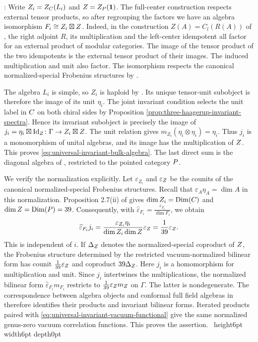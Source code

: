 \documentclass[leqno]{article}
\let\cal\relax
\newcommand{\cal}{\mathcal}
\newcommand{\Id}{\mathrm{Id}}
\newcommand{\qed}{\hfill \vrule height6pt  width6pt depth0pt}
\newcommand{\co}{\colon}
\newcommand{\ot}{\otimes}
\newcommand{\epsi}{\varepsilon}
\newenvironment{proof}[1][]{\noindent {\it Proof #1} : }{\hbox{~}\qed
\smallskip
}
\numberwithin{equation}{section}
\begin{document}
\begin{proof}
Write $Z_i = Z_{\cal C}(L_i)$ and $\cal Z = Z_{\cal P}(\mathbf1)$. The full-center construction respects external tensor products, so after regrouping the factors we have an algebra isomorphism
$F_i \cong Z_i\boxtimes \cal Z$.
Indeed, in the construction $Z(A) = C_l(R(A))$ of \cite[Definition 2.6 p.~9]{KoR08}, the right adjoint $R$, its multiplication and the left-center idempotent all factor for an external product of modular categories. The image of the tensor product of the two idempotents is the external tensor product of their images. The induced multiplication and unit also factor. The isomorphism respects the canonical normalized-special Frobenius structures by \cite[Lemma 2.3(iii) p.~6]{KoR08}.

The algebra $L_i$ is simple, so $Z_i$ is haploid by \cite[Proposition 2.7(ii) p.~9]{KoR08}. Its unique tensor-unit subobject is therefore the image of its unit $\eta_i$. The joint invariant condition selects the unit label in $\cal C$ on both chiral sides by Proposition \ref{prop:three-haagerup-invariant-spectra}. Hence its invariant subobject is precisely the image of
$j_i = \eta_i\boxtimes\Id_{\cal Z} \co \Gamma \to Z_i\boxtimes \cal Z$.
The unit relation gives $m_{Z_i}(\eta_i\ot\eta_i) = \eta_i$. Thus $j_i$ is a monomorphism of unital algebras, and its image has the multiplication of $\cal Z$. This proves \eqref{eq:universal-invariant-bulk-algebra}. The last direct sum is the diagonal algebra of \cite[equation (2.8) p.~8]{KoR08}, restricted to the pointed category $\cal P$.

We verify the normalization explicitly. Let $\epsi_{Z_i}$ and $\epsi_{\cal Z}$ be the counits of the canonical normalized-special Frobenius structures. Recall that $\epsi_A\eta_A = \dim A$ in this normalization. Proposition 2.7(ii) of \cite{KoR08} gives
$\dim Z_i = \operatorname{Dim}(\cal C)$ and $\dim \cal Z = \operatorname{Dim}(\cal P) = 39$.
Consequently, with $\widehat\epsi_{F_i} = \frac{\epsi_{F_i}}{\dim F_i}$, we obtain
\begin{equation}
\label{eq:universal-invariant-vacuum-functional}
\widehat\epsi_{F_i} j_i
= \frac{\epsi_{Z_i}\eta_i}{\dim Z_i\dim \cal Z}\epsi_{\cal Z}
= \frac1{39}\epsi_{\cal Z}.
\end{equation}
This is independent of $i$. If $\Delta_{\cal Z}$ denotes the normalized-special coproduct of $\cal Z$, the Frobenius structure determined by the restricted vacuum-normalized bilinear form has counit $\frac1{39}\epsi_{\cal Z}$ and coproduct $39\Delta_{\cal Z}$. Here $j_i$ is a homomorphism for multiplication and unit. Since $j_i$ intertwines the multiplications, the normalized bilinear form $\widehat\epsi_{F_i}m_{F_i}$ restricts to $\frac1{39}\epsi_{\cal Z}m_{\cal Z}$ on $\Gamma$. The latter is nondegenerate. The correspondence between algebra objects and conformal full field algebras in \cite[Theorem 3.11 p.~49 and Theorem 4.15 p.~62]{Kon07} therefore identifies their products and invariant bilinear forms. Iterated products paired with \eqref{eq:universal-invariant-vacuum-functional} give the same normalized genus-zero vacuum correlation functions. This proves the assertion.
\end{proof}
\end{document}
